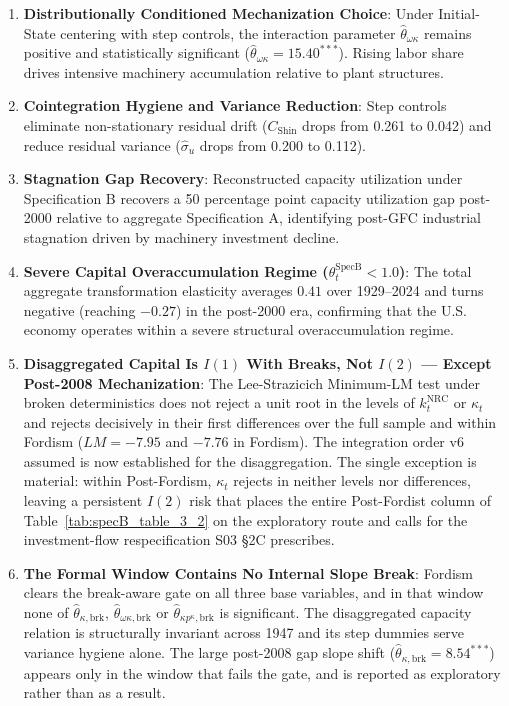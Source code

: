 \documentclass[11pt,a4paper]{article}
\begin{document}
\begin{enumerate}
    \item \textbf{Distributionally Conditioned Mechanization Choice}: Under Initial-State centering with step controls, the interaction parameter $\hat{\theta}_{\omega \kappa}$ remains positive and statistically significant ($\hat{\theta}_{\omega \kappa} = 15.40^{***}$). Rising labor share drives intensive machinery accumulation relative to plant structures.
    \item \textbf{Cointegration Hygiene and Variance Reduction}: Step controls eliminate non-stationary residual drift ($C_{\text{Shin}}$ drops from 0.261 to 0.042) and reduce residual variance ($\hat{\sigma}_u$ drops from 0.200 to 0.112).
    \item \textbf{Stagnation Gap Recovery}: Reconstructed capacity utilization under Specification B recovers a 50 percentage point capacity utilization gap post-2000 relative to aggregate Specification A, identifying post-GFC industrial stagnation driven by machinery investment decline.
    \item \textbf{Severe Capital Overaccumulation Regime ($\theta_t^{\text{SpecB}} < 1.0$)}: The total aggregate transformation elasticity averages $0.41$ over 1929--2024 and turns negative (reaching $-0.27$) in the post-2000 era, confirming that the U.S. economy operates within a severe structural overaccumulation regime.
    \item \textbf{Disaggregated Capital Is $I(1)$ With Breaks, Not $I(2)$ --- Except Post-2008 Mechanization}: The Lee-Strazicich Minimum-LM test under broken deterministics does not reject a unit root in the levels of $k_t^{\text{NRC}}$ or $\kappa_t$ and rejects decisively in their first differences over the full sample and within Fordism ($LM = -7.95$ and $-7.76$ in Fordism). The integration order v6 assumed is now established for the disaggregation. The single exception is material: within Post-Fordism, $\kappa_t$ rejects in neither levels nor differences, leaving a persistent $I(2)$ risk that places the entire Post-Fordist column of Table~\ref{tab:specB_table_3_2} on the exploratory route and calls for the investment-flow respecification S03 \S2C prescribes.
    \item \textbf{The Formal Window Contains No Internal Slope Break}: Fordism clears the break-aware gate on all three base variables, and in that window none of $\hat{\theta}_{\kappa, \text{brk}}$, $\hat{\theta}_{\omega \kappa, \text{brk}}$ or $\hat{\theta}_{\kappa p^{\kappa}, \text{brk}}$ is significant. The disaggregated capacity relation is structurally invariant across 1947 and its step dummies serve variance hygiene alone. The large post-2008 gap slope shift ($\hat{\theta}_{\kappa, \text{brk}} = 8.54^{***}$) appears only in the window that fails the gate, and is reported as exploratory rather than as a result.

\end{enumerate}
\end{document}
